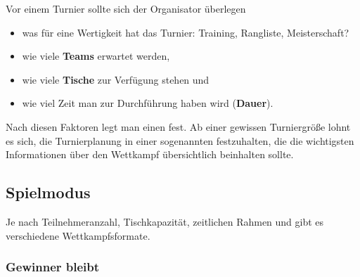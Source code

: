 Vor einem Turnier sollte sich der Organisator überlegen
\begin{itemize}
\item was für eine Wertigkeit hat das Turnier: Training, Rangliste, Meisterschaft?
\item wie viele {\normalfont \bfseries Teams} erwartet werden, 
\item wie viele {\normalfont \bfseries Tische} zur Verfügung stehen und
\item wie viel Zeit man zur Durchführung haben wird ({\normalfont \bfseries Dauer}).
\end{itemize}
Nach diesen Faktoren legt man einen  fest. 
Ab einer gewissen Turniergröße lohnt es sich, die Turnierplanung in einer sogenannten  festzuhalten, die die wichtigsten Informationen über den Wettkampf übersichtlich beinhalten sollte.

\subsection{Spielmodus}
\label{turniere:vorbereitung:modus}

Je nach Teilnehmeranzahl, Tischkapazität, zeitlichen Rahmen und
gibt es verschiedene Wettkampfsformate.


\subsubsection{Gewinner bleibt}
\label{turniere:vorbereitung:modus:fordern}

